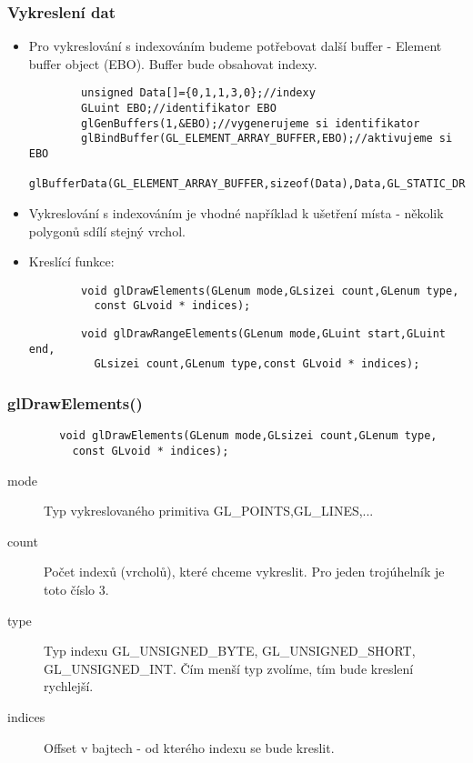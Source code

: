 \begin{frame}[fragile]
\frametitle{Vykreslení dat}
	\begin{itemize}
		\item{Pro vykreslování s indexováním budeme potřebovat další buffer - Element buffer object (EBO). Buffer bude obsahovat indexy.
		{\scriptsize
		\begin{verbatim}
		unsigned Data[]={0,1,1,3,0};//indexy
		GLuint EBO;//identifikator EBO
		glGenBuffers(1,&EBO);//vygenerujeme si identifikator
		glBindBuffer(GL_ELEMENT_ARRAY_BUFFER,EBO);//aktivujeme si EBO
		glBufferData(GL_ELEMENT_ARRAY_BUFFER,sizeof(Data),Data,GL_STATIC_DRAW);
		\end{verbatim}
		}}
		\item{Vykreslování s indexováním je vhodné například k ušetření místa - 
		několik polygonů sdílí stejný vrchol.
		}
		\item{ Kreslící funkce:
		{\scriptsize
		\begin{verbatim}
		void glDrawElements(GLenum mode,GLsizei count,GLenum type,
		  const GLvoid * indices);
		\end{verbatim}
		}
		{\scriptsize
		\begin{verbatim}
		void glDrawRangeElements(GLenum mode,GLuint start,GLuint end,
		  GLsizei count,GLenum type,const GLvoid * indices);
		\end{verbatim}
		}
		}
	\end{itemize}
\end{frame}

\begin{frame}[fragile]
\frametitle{glDrawElements()}
	\begin{itemize}
		{\scriptsize
		\begin{verbatim}
		void glDrawElements(GLenum mode,GLsizei count,GLenum type,
		  const GLvoid * indices);
		\end{verbatim}
		}
		\begin{description}
		\item[mode] Typ vykreslovaného primitiva GL\_POINTS,GL\_LINES,...
		\item[count] Počet indexů (vrcholů), které chceme vykreslit.
		Pro jeden trojúhelník je toto číslo 3.
		\item[type] Typ indexu GL\_UNSIGNED\_BYTE, GL\_UNSIGNED\_SHORT, GL\_UNSIGNED\_INT.
		Čím menší typ zvolíme, tím bude kreslení rychlejší.
		\item[indices] Offset v bajtech - od kterého indexu se bude kreslit.
		\end{description}


	\end{itemize}
\end{frame}

